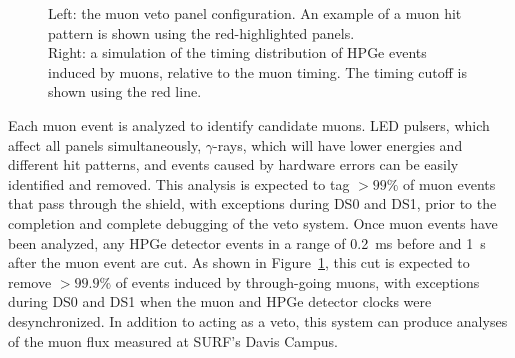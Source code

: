 \documentclass[/main.tex]{subfiles}
\begin{document}
\begin{figure}
  \centering
  \caption[Muon veto system]{\label{fig:muonveto}
    Left: the muon veto panel configuration. An example of a muon hit pattern is shown using the red-highlighted panels.\\
    Right: a simulation of the timing distribution of HPGe events induced by muons, relative to the muon timing. The timing cutoff is shown using the red line.
  }
\end{figure}
Each muon event is analyzed to identify candidate muons.
LED pulsers, which affect all panels simultaneously, $\gamma$-rays, which will have lower energies and different hit patterns, and events caused by hardware errors can be easily identified and removed.
This analysis is expected to tag $>99\%$ of muon events that pass through the shield, with exceptions during DS0 and DS1, prior to the completion and complete debugging of the veto system.
Once muon events have been analyzed, any HPGe detector events in a range of 0.2~ms before and 1~s after the muon event are cut.
As shown in Figure~\ref{fig:muonveto}, this cut is expected to remove $>99.9\%$ of events induced by through-going muons, with exceptions during DS0 and DS1 when the muon and HPGe detector clocks were desynchronized.
In addition to acting as a veto, this system can produce analyses of the muon flux measured at SURF's Davis Campus\cite{mjdmuonflux}.
\end{document}

